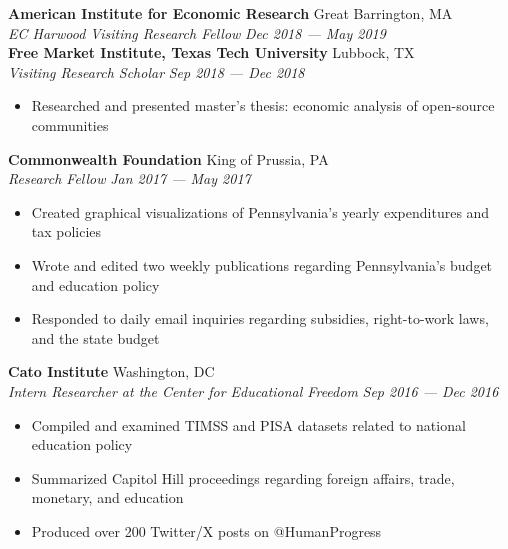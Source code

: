 \documentclass[a4paper,12pt]{article}
\begin{document}
\textbf{American Institute for Economic Research} \hfill Great Barrington, MA\\
\textit{EC Harwood Visiting Research Fellow} \hfill  \textit{Dec 2018 --- May 2019}\\
\vspace{1mm}
\textbf{Free Market Institute, Texas Tech University} \hfill Lubbock, TX\\
\textit{Visiting Research Scholar} \hfill  \textit{Sep 2018 --- Dec 2018}
\begin{itemize}
    \item Researched and presented master's thesis: economic analysis of open-source communities
\end{itemize}
\vspace{1mm}

\textbf{Commonwealth Foundation} \hfill King of Prussia, PA\\
\textit{Research Fellow} \hfill  \textit{Jan 2017 --- May 2017}
\begin{itemize}
    \item Created graphical visualizations of Pennsylvania's yearly expenditures and tax policies
    \item Wrote and edited two weekly publications regarding Pennsylvania's budget and education policy
    \item Responded to daily email inquiries regarding subsidies, right-to-work laws, and the state budget
\end{itemize}
\vspace{1mm}

\textbf{Cato Institute} \hfill Washington, DC\\
\textit{Intern Researcher at the Center for Educational Freedom} \hfill \textit{Sep 2016 --- Dec 2016}
\begin{itemize}
    \item Compiled and examined TIMSS and PISA datasets related to national education policy
    \item Summarized Capitol Hill proceedings regarding foreign affairs, trade, monetary, and education
    \item Produced over 200 Twitter/X posts on @HumanProgress
\end{itemize} 

\end{document}
